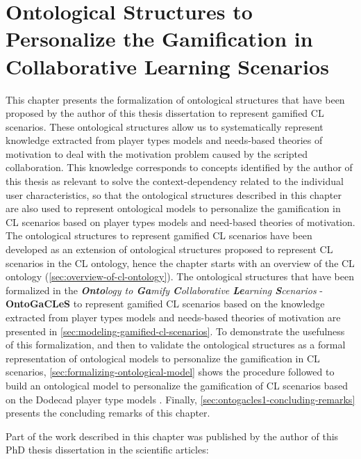 
\chapter[Ontological Structures to Personalize the Gamification in CL Scenarios]{Ontological Structures to Personalize the Gamification in Collaborative Learning Scenarios}
\label{chapter:ontogacles-1}

This chapter presents the formalization of ontological structures that have been proposed by the author of this thesis dissertation to represent gamified CL scenarios. These ontological structures allow us to systematically represent knowledge extracted from player types models and needs-based theories of motivation to deal with the motivation problem caused by the scripted collaboration. This knowledge corresponds to concepts identified by the author of this thesis as relevant to solve the context-dependency related to the individual user characteristics, so that the ontological structures described in this chapter are also used to represent ontological models to personalize the gamification in CL scenarios based on player types models and need-based theories of motivation. The ontological structures to represent gamified CL scenarios have been developed as an extension of ontological structures proposed to represent CL scenarios in the CL ontology, hence the chapter starts with an overview of the CL ontology (\autoref{sec:overview-of-cl-ontology}). The ontological structures that have been formalized in the \emph{\textbf{Onto}logy to \textbf{Ga}mify \textbf{C}ollaborative \textbf{Le}arning \textbf{S}cenarios} - \textbf{OntoGaCLeS} to represent gamified CL scenarios based on the knowledge extracted from player types models and needs-based theories of motivation are presented in \autoref{sec:modeling-gamified-cl-scenarios}. To demonstrate the usefulness of this formalization, and then to validate the ontological structures as a formal representation of ontological models to personalize the gamification in CL scenarios, \autoref{sec:formalizing-ontological-model} shows the procedure followed to build an ontological model to personalize the gamification of CL scenarios based on the Dodecad player type models \cite{Marczewski2015b}. Finally, \autoref{sec:ontogacles1-concluding-remarks} presents the concluding remarks of this chapter.

Part of the work described in this chapter was published by the author of this PhD thesis dissertation in the scientific articles:

